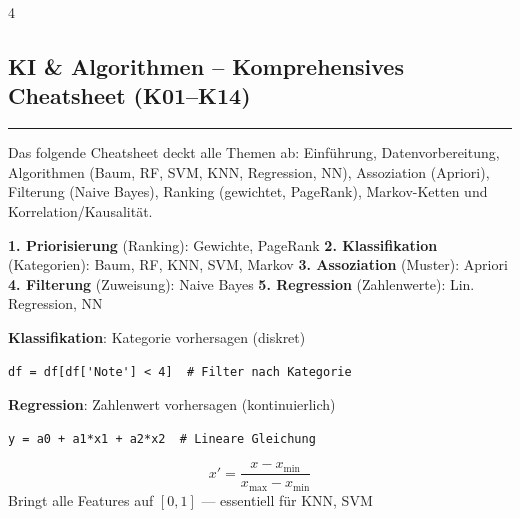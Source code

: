 \begin{landscape}
	\tiny
	\begin{multicols*}{4}
		\textcolor{\cheatSheetColor}{
			\begin{centering}
				\section*{KI \& Algorithmen -- Komprehensives Cheatsheet (K01--K14)}
			\end{centering}
			\hrule
			Das folgende Cheatsheet deckt alle Themen ab: Einführung, Datenvorbereitung, Algorithmen (Baum, RF, SVM, KNN, Regression, NN), Assoziation (Apriori), Filterung (Naive Bayes), Ranking (gewichtet, PageRank), Markov-Ketten und Korrelation/Kausalität.
			\vspace{0.2em}
		}

		
		\begin{cheatSheetBox}[title=Algorithmen nach Funktionsart]
			\textbf{1. Priorisierung} (Ranking): Gewichte, PageRank
			\textbf{2. Klassifikation} (Kategorien): Baum, RF, KNN, SVM, Markov
			\textbf{3. Assoziation} (Muster): Apriori
			\textbf{4. Filterung} (Zuweisung): Naive Bayes
			\textbf{5. Regression} (Zahlenwerte): Lin. Regression, NN
		\end{cheatSheetBox}

		\begin{cheatSheetBox}[title=Klassifikation vs. Regression]
			\textbf{Klassifikation}: Kategorie vorhersagen (diskret)
			\begin{lstlisting}
df = df[df['Note'] < 4]  # Filter nach Kategorie
			\end{lstlisting}
			\textbf{Regression}: Zahlenwert vorhersagen (kontinuierlich)
			\begin{lstlisting}
y = a0 + a1*x1 + a2*x2  # Lineare Gleichung
			\end{lstlisting}
		\end{cheatSheetBox}


		\begin{cheatSheetBox}[title=Min-Max-Normalisierung]
			\[x' = \frac{x - x_{\min}}{x_{\max} - x_{\min}}\]
			Bringt alle Features auf $[0, 1]$ — essentiell für KNN, SVM
		\end{cheatSheetBox}


\end{multicols*}
\end{landscape}
